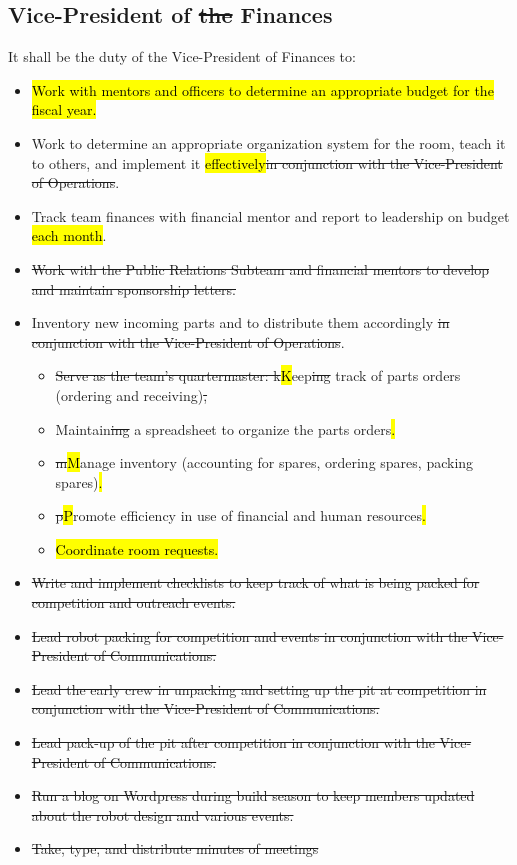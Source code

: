 \documentclass[12pt, a4paper]{article}
\begin{document}
\subsection{Vice-President of \st{the} Finances}
It shall be the duty of the Vice-President of Finances to:
\begin{itemize}
\item \hl{Work with mentors and officers to determine an appropriate budget for the fiscal year.}
\item Work to determine an appropriate organization system for the room, teach it to others, and implement it \hl{effectively}\st{in conjunction with the Vice-President of Operations}.
\item Track team finances with financial mentor and report to leadership on budget \hl{each month}.
\item \st{Work with the Public Relations Subteam and financial mentors to develop and maintain sponsorship letters. } 
\item Inventory new incoming parts and to distribute them accordingly \st{in conjunction with the Vice-President of Operations}.
	\begin{itemize}
	\item \st{Serve as the team’s quartermaster: k}\hl{K}eep\st{ing} track of parts orders (ordering and receiving)\st{,}
    \item Maintain\st{ing} a spreadsheet to organize the parts orders\hl{.}
	\item \st{m}\hl{M}anage inventory (accounting for spares, ordering spares, packing spares)\hl{.}
	\item \st{p}\hl{P}romote efficiency in use of financial and human resources\hl{.}
    \item \hl{Coordinate room requests.}
\end{itemize}
\item \st{Write and implement checklists to keep track of what is being packed for competition and outreach events.}
\item \st{Lead robot packing for competition and events in conjunction with the Vice-President of Communications.}
\item \st{Lead the early crew in unpacking and setting up the pit at competition in conjunction with the Vice-President of Communications.}
\item \st{Lead pack-up of the pit after competition in conjunction with the Vice-President of Communications.}
\item \st{Run a blog on Wordpress during build season to keep members updated about the robot design and various events.}
\item \st{Take, type, and distribute minutes of meetings}
\end{itemize}
\end{document}
